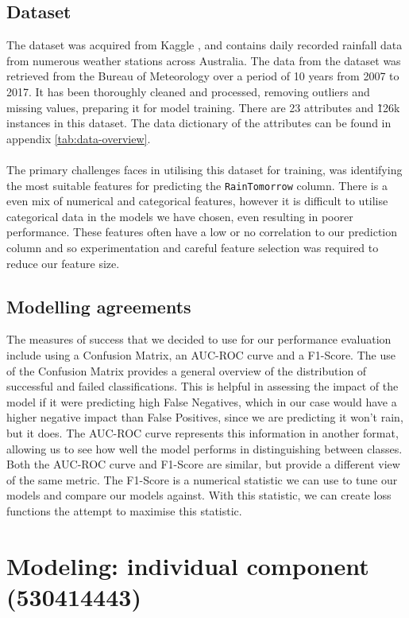 \documentclass[10pt]{article}
\begin{document}
\subsection{Dataset}
The dataset was acquired from Kaggle \cite{kaggle}, and contains daily recorded rainfall data from numerous weather stations across Australia. The data from the dataset was retrieved from the Bureau of Meteorology over a period of 10 years from 2007 to 2017. It has been thoroughly cleaned and processed, removing outliers and missing values, preparing it for model training. There are 23 attributes and \~126k instances in this dataset. The data dictionary of the attributes can be found in appendix \ref{tab:data-overview}.
\\\\
The primary challenges faces in utilising this dataset for training, was identifying the most suitable features for predicting the \texttt{RainTomorrow} column. There is a even mix of numerical and categorical features, however it is difficult to utilise categorical data in the models we have chosen, even resulting in poorer performance. These features often have a low or no correlation to our prediction column and so experimentation and careful feature selection was required to reduce our feature size.

\subsection{Modelling agreements}
The measures of success that we decided to use for our performance evaluation include using a Confusion Matrix, an AUC-ROC curve and a F1-Score. The use of the Confusion Matrix provides a general overview of the distribution of successful and failed classifications. This is helpful in assessing the impact of the model if it were predicting high False Negatives, which in our case would have a higher negative impact than False Positives, since we are predicting it won't rain, but it does. The AUC-ROC curve represents this information in another format, allowing us to see how well the model performs in distinguishing between classes. Both the AUC-ROC curve and F1-Score are similar, but provide a different view of the same metric. The F1-Score is a numerical statistic we can use to tune our models and compare our models against. With this statistic, we can create loss functions the attempt to maximise this statistic.

\pagebreak
\section{Modeling: individual component (530414443)}
\end{document}
